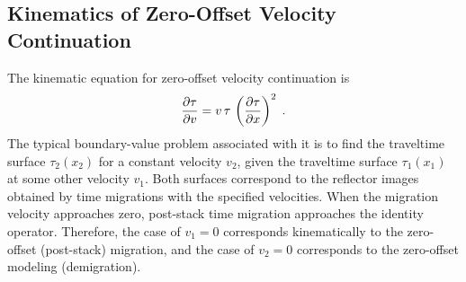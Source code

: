 \subsection{Kinematics of Zero-Offset Velocity Continuation}
The kinematic equation for zero-offset velocity continuation is
\begin{equation}
{{\partial \tau} \over {\partial v}} = 
v\,\tau\,\left({{\partial \tau} \over {\partial x}}\right)^2\;.
\label{eq:POMeikonal} 
\end{equation}
The typical boundary-value problem associated with it is to find the
traveltime surface $\tau_2(x_2)$ for a constant velocity $v_2$, given the
traveltime surface $\tau_1(x_1)$ at some other velocity $v_1$. Both surfaces
correspond to the reflector images obtained by time migrations with the
specified velocities.  When the migration velocity approaches zero, post-stack
time migration approaches the identity operator. Therefore, the case of $v_1 =
0$ corresponds kinematically to the zero-offset (post-stack) migration, and
the case of $v_2 = 0$ corresponds to the zero-offset modeling (demigration).

